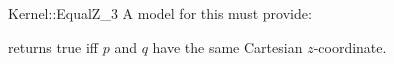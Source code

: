 \begin{ccRefFunctionObjectConcept}{Kernel::EqualZ_3}
A model for this must provide:


{returns true iff $p$ and $q$ have the same Cartesian $z$-coordinate.}

\ccSeeAlso
{}\\

\end{ccRefFunctionObjectConcept}
